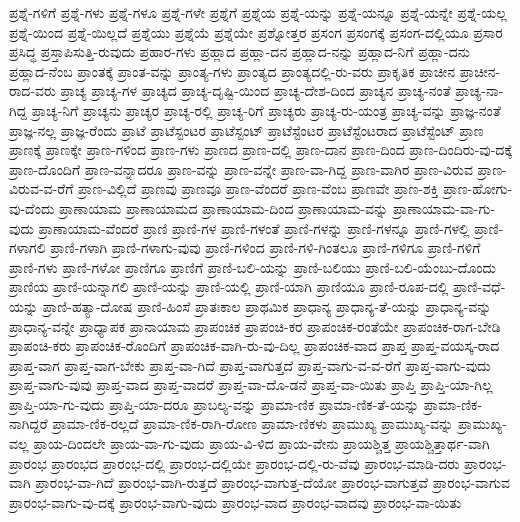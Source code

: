 {ಪ್ರಶ್ನೆ-ಗಳಿಗೆ
ಪ್ರಶ್ನೆ-ಗಳು
ಪ್ರಶ್ನೆ-ಗಳೂ
ಪ್ರಶ್ನೆ-ಗಳೇ
ಪ್ರಶ್ನೆಗೆ
ಪ್ರಶ್ನೆಯ
ಪ್ರಶ್ನೆ-ಯನ್ನು
ಪ್ರಶ್ನೆ-ಯನ್ನೂ
ಪ್ರಶ್ನೆ-ಯನ್ನೇ
ಪ್ರಶ್ನೆ-ಯಲ್ಲ
ಪ್ರಶ್ನೆ-ಯಿಂದ
ಪ್ರಶ್ನೆ-ಯಿಲ್ಲದೆ
ಪ್ರಶ್ನೆಯು
ಪ್ರಶ್ನೆಯೆ
ಪ್ರಶ್ನೆಯೇ
ಪ್ರಶ್ನೋತ್ತರ
ಪ್ರಸಂಗ
ಪ್ರಸಂಗಕ್ಕೆ
ಪ್ರಸಂಗ-ದಲ್ಲಿಯೂ
ಪ್ರಸಾರ
ಪ್ರಸಿದ್ಧ
ಪ್ರಸ್ತಾಪಿಸುತ್ತಿ-ರುವುದು
ಪ್ರಹಾರ-ಗಳು
ಪ್ರಹ್ಲಾದ
ಪ್ರಹ್ಲಾ-ದನ
ಪ್ರಹ್ಲಾದ-ನನ್ನು
ಪ್ರಹ್ಲಾದ-ನಿಗೆ
ಪ್ರಹ್ಲಾ-ದನು
ಪ್ರಹ್ಲಾದ-ನೆಂಬ
ಪ್ರಾಂತಕ್ಕೆ
ಪ್ರಾಂತ-ವನ್ನು
ಪ್ರಾಂತ್ಯ-ಗಳು
ಪ್ರಾಂತ್ಯದ
ಪ್ರಾಂತ್ಯದಲ್ಲಿ-ರು-ವರು
ಪ್ರಾಕೃತಿಕ
ಪ್ರಾಚೀನ
ಪ್ರಾಚೀನ-ರಾದ-ವರು
ಪ್ರಾಚ್ಯ
ಪ್ರಾಚ್ಯ-ಗಳ
ಪ್ರಾಚ್ಯದ
ಪ್ರಾಚ್ಯ-ದೃಷ್ಟಿ-ಯಿಂದ
ಪ್ರಾಚ್ಯ-ದೇಶ-ದಿಂದ
ಪ್ರಾಚ್ಯನ
ಪ್ರಾಚ್ಯ-ನಂತೆ
ಪ್ರಾಚ್ಯ-ನಾ-ಗಿದ್ದ
ಪ್ರಾಚ್ಯ-ನಿಗೆ
ಪ್ರಾಚ್ಯನು
ಪ್ರಾಚ್ಯರ
ಪ್ರಾಚ್ಯ-ರಲ್ಲಿ
ಪ್ರಾಚ್ಯ-ರಿಗೆ
ಪ್ರಾಚ್ಯರು
ಪ್ರಾಚ್ಯ-ರು-ಯಂತ್ರ
ಪ್ರಾಚ್ಯ-ವನ್ನು
ಪ್ರಾಜ್ಞ-ನಂತೆ
ಪ್ರಾಜ್ಞ-ನಲ್ಲ
ಪ್ರಾಜ್ಞ-ರೆಂದು
ಪ್ರಾಟೆ
ಪ್ರಾಟೆಸ್ಟಂಟರ
ಪ್ರಾಟೆಸ್ಟಂಟ್
ಪ್ರಾಟೆಸ್ಟೆಂಟರ
ಪ್ರಾಟೆಸ್ಟೆಂಟರಾದ
ಪ್ರಾಟೆಸ್ಟೆಂಟ್
ಪ್ರಾಣ
ಪ್ರಾಣಕ್ಕೆ
ಪ್ರಾಣಕ್ಕೇ
ಪ್ರಾಣ-ಗಳಿಂದ
ಪ್ರಾಣ-ಗಳು
ಪ್ರಾಣದ
ಪ್ರಾಣ-ದಲ್ಲಿ
ಪ್ರಾಣ-ದಾನ
ಪ್ರಾಣ-ದಿಂದ
ಪ್ರಾಣ-ದಿಂದಿರು-ವು-ದಕ್ಕೆ
ಪ್ರಾಣ-ದೊಂದಿಗೆ
ಪ್ರಾಣ-ವನ್ನಾದರೂ
ಪ್ರಾಣ-ವನ್ನು
ಪ್ರಾಣ-ವನ್ನೇ
ಪ್ರಾಣ-ವಾ-ಗಿದ್ದ
ಪ್ರಾಣ-ವಾಗಿರ
ಪ್ರಾಣ-ವಿರುವ
ಪ್ರಾಣ-ವಿರುವ-ವ-ರೆಗೆ
ಪ್ರಾಣ-ವಿಲ್ಲಿದೆ
ಪ್ರಾಣವು
ಪ್ರಾಣವೂ
ಪ್ರಾಣ-ವೆಂದರೆ
ಪ್ರಾಣ-ವೆಂಬ
ಪ್ರಾಣವೇ
ಪ್ರಾಣ-ಶಕ್ತಿ
ಪ್ರಾಣ-ಹೋಗು-ವು-ದೆಂದು
ಪ್ರಾಣಾಯಾಮ
ಪ್ರಾಣಾಯಾಮದ
ಪ್ರಾಣಾಯಾಮ-ದಿಂದ
ಪ್ರಾಣಾಯಾಮ-ವನ್ನು
ಪ್ರಾಣಾಯಾಮ-ವಾ-ಗು-ವುದು
ಪ್ರಾಣಾಯಾಮ-ವೆಂದರೆ
ಪ್ರಾಣಿ
ಪ್ರಾಣಿ-ಗಳ
ಪ್ರಾಣಿ-ಗಳಂತೆ
ಪ್ರಾಣಿ-ಗಳನ್ನು
ಪ್ರಾಣಿ-ಗಳನ್ನೂ
ಪ್ರಾಣಿ-ಗಳಲ್ಲಿ
ಪ್ರಾಣಿ-ಗಳಾಗಲಿ
ಪ್ರಾಣಿ-ಗಳಾಗಿ
ಪ್ರಾಣಿ-ಗಳಾಗು-ವುವು
ಪ್ರಾಣಿ-ಗಳಿಂದ
ಪ್ರಾಣಿ-ಗಳಿ-ಗಿಂತಲೂ
ಪ್ರಾಣಿ-ಗಳಿಗೂ
ಪ್ರಾಣಿ-ಗಳಿಗೆ
ಪ್ರಾಣಿ-ಗಳು
ಪ್ರಾಣಿ-ಗಳೋ
ಪ್ರಾಣಿಗೂ
ಪ್ರಾಣಿಗೆ
ಪ್ರಾಣಿ-ಬಲಿ-ಯನ್ನು
ಪ್ರಾಣಿ-ಬಲಿಯು
ಪ್ರಾಣಿ-ಬಲಿ-ಯೆಂಬು-ದೊಂದು
ಪ್ರಾಣಿಯ
ಪ್ರಾಣಿ-ಯನ್ನಾಗಲಿ
ಪ್ರಾಣಿ-ಯನ್ನು
ಪ್ರಾಣಿ-ಯಲ್ಲಿ
ಪ್ರಾಣಿ-ಯಾಗಿ
ಪ್ರಾಣಿಯೂ
ಪ್ರಾಣಿ-ರೂಪ-ದಲ್ಲಿ
ಪ್ರಾಣಿ-ವಧೆ-ಯನ್ನು
ಪ್ರಾಣಿ-ಹತ್ಯಾ-ದೋಷ
ಪ್ರಾಣಿ-ಹಿಂಸೆ
ಪ್ರಾತಃಕಾಲ
ಪ್ರಾಥಮಿಕ
ಪ್ರಾಧಾನ್ಯ
ಪ್ರಾಧಾನ್ಯ-ತೆ-ಯನ್ನು
ಪ್ರಾಧಾನ್ಯ-ವನ್ನು
ಪ್ರಾಧಾನ್ಯ-ವನ್ನೇ
ಪ್ರಾಧ್ಯಾಪಕ
ಪ್ರಾನಾಯಾಮ
ಪ್ರಾಪಂಚಿಕ
ಪ್ರಾಪಂಚಿ-ಕರ
ಪ್ರಾಪಂಚಿಕ-ರಂತೆಯೇ
ಪ್ರಾಪಂಚಿಕ-ರಾಗ-ಬೇಡಿ
ಪ್ರಾಪಂಚಿ-ಕರು
ಪ್ರಾಪಂಚಿಕ-ರೊಂದಿಗೆ
ಪ್ರಾಪಂಚಿಕ-ವಾಗಿ-ರು-ವು-ದಿಲ್ಲ
ಪ್ರಾಪಂಚಿಕ-ವಾದ
ಪ್ರಾಪ್ತ
ಪ್ರಾಪ್ತ-ವಯಸ್ಕ-ರಾದ
ಪ್ರಾಪ್ತ-ವಾಗ
ಪ್ರಾಪ್ತ-ವಾಗ-ಬೇಕು
ಪ್ರಾಪ್ತ-ವಾ-ಗಿದೆ
ಪ್ರಾಪ್ತ-ವಾಗುತ್ತದೆ
ಪ್ರಾಪ್ತ-ವಾಗು-ವ-ವ-ರೆಗೆ
ಪ್ರಾಪ್ತ-ವಾಗು-ವುದು
ಪ್ರಾಪ್ತ-ವಾಗು-ವುವು
ಪ್ರಾಪ್ತ-ವಾದ
ಪ್ರಾಪ್ತ-ವಾದರೆ
ಪ್ರಾಪ್ತ-ವಾ-ದೊ-ಡನೆ
ಪ್ರಾಪ್ತ-ವಾ-ಯಿತು
ಪ್ರಾಪ್ತಿ
ಪ್ರಾಪ್ತಿ-ಯಾ-ಗಿಲ್ಲ
ಪ್ರಾಪ್ತಿ-ಯಾ-ಗು-ವುದು
ಪ್ರಾಪ್ತಿ-ಯಾ-ದರೂ
ಪ್ರಾಬಲ್ಯ-ವನ್ನು
ಪ್ರಾಮಾ-ಣಿಕ
ಪ್ರಾಮಾ-ಣಿಕ-ತೆ-ಯನ್ನು
ಪ್ರಾಮಾ-ಣಿಕ-ನಾಗಿದ್ದರೆ
ಪ್ರಾಮಾ-ಣಿಕ-ರಲ್ಲದೆ
ಪ್ರಾಮಾ-ಣಿಕ-ರಾಗಿ-ರೋಣ
ಪ್ರಾಮಾ-ಣಿಕಳು
ಪ್ರಾಮುಖ್ಯ
ಪ್ರಾಮುಖ್ಯ-ವನ್ನು
ಪ್ರಾಮುಖ್ಯ-ವಲ್ಲ
ಪ್ರಾಯ-ದಿಂದಲೇ
ಪ್ರಾಯ-ವಾ-ಗು-ವುದು
ಪ್ರಾಯ-ವಿ-ಳಿದ
ಪ್ರಾಯ-ವೇನು
ಪ್ರಾಯಶ್ಚಿತ್ತ
ಪ್ರಾಯಶ್ಚಿತ್ತಾರ್ಥ-ವಾಗಿ
ಪ್ರಾರಂಭ
ಪ್ರಾರಂಭದ
ಪ್ರಾರಂಭ-ದಲ್ಲಿ
ಪ್ರಾರಂಭ-ದಲ್ಲಿಯೇ
ಪ್ರಾರಂಭ-ದಲ್ಲಿ-ರು-ವೆವು
ಪ್ರಾರಂಭ-ಮಾಡಿ-ದರು
ಪ್ರಾರಂಭ-ವಾಗಿ
ಪ್ರಾರಂಭ-ವಾ-ಗಿದೆ
ಪ್ರಾರಂಭ-ವಾಗಿ-ರುತ್ತದೆ
ಪ್ರಾರಂಭ-ವಾಗುತ್ತ-ದೆಯೋ
ಪ್ರಾರಂಭ-ವಾಗುತ್ತವೆ
ಪ್ರಾರಂಭ-ವಾಗುವ
ಪ್ರಾರಂಭ-ವಾಗು-ವು-ದಕ್ಕೆ
ಪ್ರಾರಂಭ-ವಾಗು-ವುದು
ಪ್ರಾರಂಭ-ವಾದ
ಪ್ರಾರಂಭ-ವಾದವು
ಪ್ರಾರಂಭ-ವಾ-ಯಿತು
}

